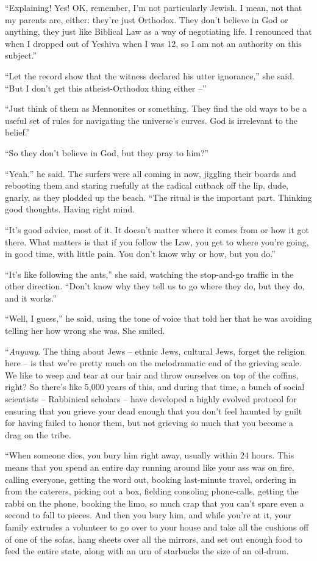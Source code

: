“Explaining! Yes! OK, remember, I'm not particularly Jewish. I mean, 
not that my parents are, either: they're just Orthodox. They don't 
believe in God or anything, they just like Biblical Law as a way of 
negotiating life. I renounced that when I dropped out of Yeshiva when I 
was 12, so I am not an authority on this subject.”

“Let the record show that the witness declared his utter 
ignorance,” she said. “But I don't get this atheist-Orthodox thing 
either --”

“Just think of them as Mennonites or something. They find the old 
ways to be a useful set of rules for navigating the universe's curves. 
God is irrelevant to the belief.”

“So they don't believe in God, but they pray to him?”

“Yeah,” he said. The surfers were all coming in now, jiggling their 
boards and rebooting them and staring ruefully at the radical cutback 
off the lip, dude, gnarly, as they plodded up the beach. “The ritual 
is the important part. Thinking good thoughts. Having right mind.

“It's good advice, most of it. It doesn't matter where it comes from 
or how it got there. What matters is that if you follow the Law, you 
get to where you're going, in good time, with little pain. You don't 
know why or how, but you do.”

“It's like following the ants,” she said, watching the stop-and-go 
traffic in the other direction. “Don't know why they tell us to go 
where they do, but they do, and it works.”

“Well, I guess,” he said, using the tone of voice that told her 
that he was avoiding telling her how wrong she was. She smiled.

“\emph{Anyway}. The thing about Jews -- ethnic Jews, cultural Jews, 
forget the religion here -- is that we're pretty much on the 
melodramatic end of the grieving scale. We like to weep and tear at our 
hair and throw ourselves on top of the coffins, right? So there's like 
5,000 years of this, and during that time, a bunch of social scientists 
-- Rabbinical scholars -- have developed a highly evolved protocol for 
ensuring that you grieve your dead enough that you don't feel haunted 
by guilt for having failed to honor them, but not grieving so much that 
you become a drag on the tribe.

“When someone dies, you bury him right away, usually within 24 hours. 
This means that you spend an entire day running around like your ass 
was on fire, calling everyone, getting the word out, booking 
last-minute travel, ordering in from the caterers, picking out a box, 
fielding consoling phone-calls, getting the rabbi on the phone, booking 
the limo, so much crap that you can't spare even a second to fall to 
pieces. And then you bury him, and while you're at it, your family 
extrudes a volunteer to go over to your house and take all the cushions 
off of one of the sofas, hang sheets over all the mirrors, and set out 
enough food to feed the entire state, along with an urn of starbucks 
the size of an oil-drum.

